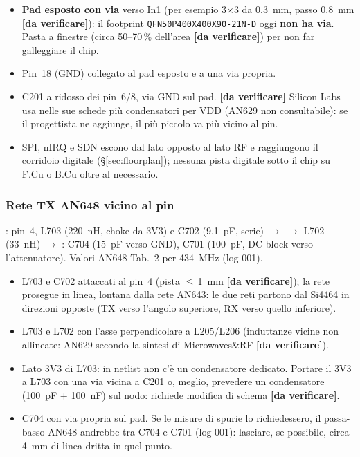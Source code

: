 \documentclass[a4paper,10pt]{article}
\newcommand{\net}[1]{\texttt{\detokenize{#1}}}
\newcommand{\dv}{\textcolor{verfr}{\textbf{[da verificare]}}}
\newcounter{regola}
\begin{document}
\begin{regola}[IC204]
\begin{itemize}
\item \textbf{Pad esposto con via} verso In1 (per esempio 3$\times$3 da \SI{0.3}{mm}, passo \SI{0.8}{mm}
      \dv): il footprint \texttt{QFN50P400X400X90-21N-D} oggi \textbf{non ha via}. Pasta a finestre
      (circa 50--70\,\% dell'area \dv) per non far galleggiare il chip.
\item Pin~18 (GND) collegato al pad esposto e a una via propria.
\item C201 a ridosso dei pin~6/8, via GND sul pad. \dv{} Silicon Labs usa nelle sue schede più
      condensatori per VDD (AN629 non consultabile): se il progettista ne aggiunge, il più piccolo va più
      vicino al pin.
\item SPI, nIRQ e SDN escono dal lato opposto al lato RF e raggiungono il corridoio digitale
      (\S\ref{sec:floorplan}); nessuna pista digitale sotto il chip su F.Cu o B.Cu oltre al necessario.
\end{itemize}
\end{regola}

\subsubsection{Rete TX AN648 vicino al pin}
\net{RF_SI_TX}: pin~4, L703 (\SI{220}{nH}, choke da 3V3) e C702 (\SI{9.1}{pF}, serie) $\rightarrow$
\net{RF_TX_M1} $\rightarrow$ L702 (\SI{33}{nH}) $\rightarrow$ \net{RF_TX_M2}: C704 (\SI{15}{pF} verso GND),
C701 (\SI{100}{pF}, DC block verso l'attenuatore). Valori AN648 Tab.~2 per \SI{434}{MHz} (log 001).

\begin{regola}[AN648]
\begin{itemize}
\item L703 e C702 attaccati al pin~4 (pista $\le$\,\SI{1}{mm} \dv); la rete prosegue in linea, lontana
      dalla rete AN643: le due reti partono dal Si4464 in direzioni opposte (TX verso l'angolo superiore,
      RX verso quello inferiore).
\item L703 e L702 con l'asse perpendicolare a L205/L206 (induttanze vicine non allineate: AN629 secondo
      la sintesi di Microwaves\&RF \dv).
\item Lato 3V3 di L703: in netlist non c'è un condensatore dedicato. Portare il 3V3 a L703 con una via vicina
      a C201 o, meglio, prevedere un condensatore (\SI{100}{pF} + \SI{100}{nF}) sul nodo: richiede modifica di
      schema \dv.
\item C704 con via propria sul pad. Se le misure di spurie lo richiedessero, il passa-basso AN648 andrebbe
      tra C704 e C701 (log 001): lasciare, se possibile, circa \SI{4}{mm} di linea dritta in quel punto.
\end{itemize}
\end{regola}
\end{document}
